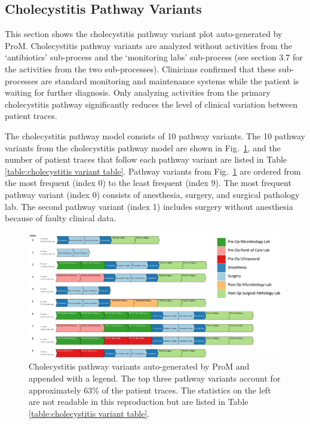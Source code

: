 \documentclass{elsarticle}
\begin{document}
\subsection{Cholecystitis Pathway Variants}
This section shows the cholecystitis pathway variant plot auto-generated by ProM. Cholecystitis pathway variants are analyzed without activities from the `antibiotics' sub-process and the `monitoring labs' sub-process (see section 3.7 for the activities from the two sub-processes). Clinicians confirmed that these sub-processes are standard monitoring and maintenance systems while the patient is waiting for further diagnosis. Only analyzing activities from the primary cholecystitis pathway significantly reduces the level of clinical variation between patient traces.

The cholecystitis pathway model consists of 10 pathway variants. The 10 pathway variants from the cholecystitis pathway model are shown in Fig.~\ref{fig:cholecystitis pathway variants}, and the number of patient traces that follow each pathway variant are listed in Table \ref{table:cholecystitis variant table}. Pathway variants from Fig.~\ref{fig:cholecystitis pathway variants} are ordered from the most frequent (index 0) to the least frequent (index 9). The most frequent pathway variant (index 0) consists of anesthesia, surgery, and surgical pathology lab. The second pathway variant (index 1) includes surgery without anesthesia because of faulty clinical data.

\begin{figure}[t]
\hspace{-2cm}
\includegraphics[width=1.5\textwidth]{images/cholecystitis_variant_index_anes.jpg}
\caption{Cholecystitis pathway variants auto-generated by ProM and appended with a legend. The top three pathway variants account for approximately 63\% of the patient traces. The statistics on the left are not readable in this reproduction but are listed in Table \ref{table:cholecystitis variant table}.}
\label{fig:cholecystitis pathway variants}
\end{figure}
\end{document}
